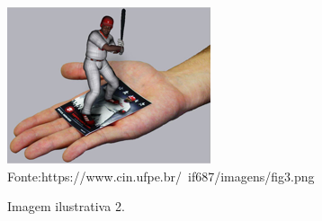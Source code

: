 \documentclass[10pt]{article}
\begin{document}
\begin{figure}[!htb]
    \centering
    \caption{Imagem ilustrativa 2.}
    \includegraphics[scale=1]{imagens/fig3.png}\\
    {\footnotesize Fonte:https://www.cin.ufpe.br/~if687/imagens/fig3.png}
    \label{fig:my_label}
\end{figure}




\cite{Judith}

\end{document}
